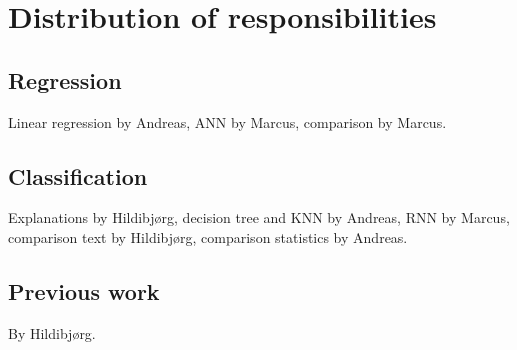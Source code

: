 \appendix
\section{Distribution of responsibilities}
\subsection{Regression}
Linear regression by Andreas,
ANN by Marcus,
comparison by Marcus.
\subsection{Classification}
Explanations by Hildibjørg,
decision tree and KNN by Andreas,
RNN by Marcus,
comparison text by Hildibjørg,
comparison statistics by Andreas.
\subsection{Previous work}
By Hildibjørg.
